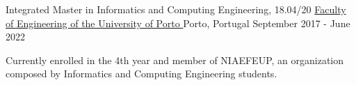
\begin{cventries}
  \cventry
    {Integrated Master in Informatics and Computing Engineering, 18.04/20} %
    {\href{https://sigarra.up.pt/feup/en/web_page.inicial}{Faculty of Engineering of the University of Porto \faExternalLink}} %
    {Porto, Portugal} %
    {September 2017 - June 2022} %
    {
      \begin{cvitems}
        \item {Currently enrolled in the 4th year and member of NIAEFEUP, an organization composed by Informatics and Computing Engineering students.}
      \end{cvitems}
    }
\end{cventries}
